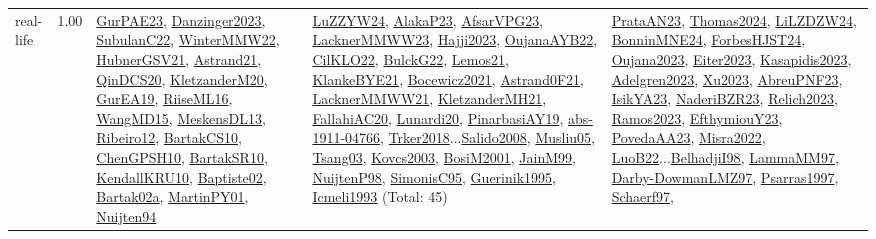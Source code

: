 {\begin{longtable}{p{3cm}r>{\raggedright\arraybackslash}p{6cm}>{\raggedright\arraybackslash}p{6cm}>{\raggedright\arraybackslash}p{8cm}}
\index{real-life}\index{Benchmarks!real-life}real-life &  1.00 & \hyperref[detail:GurPAE23]{GurPAE23}, \hyperref[detail:Danzinger2023]{Danzinger2023}, \hyperref[detail:SubulanC22]{SubulanC22}, \hyperref[detail:WinterMMW22]{WinterMMW22}, \hyperref[detail:HubnerGSV21]{HubnerGSV21}, \hyperref[detail:Astrand21]{Astrand21}, \hyperref[detail:QinDCS20]{QinDCS20}, \hyperref[detail:KletzanderM20]{KletzanderM20}, \hyperref[detail:GurEA19]{GurEA19}, \hyperref[detail:RiiseML16]{RiiseML16}, \hyperref[detail:WangMD15]{WangMD15}, \hyperref[detail:MeskensDL13]{MeskensDL13}, \hyperref[detail:Ribeiro12]{Ribeiro12}, \hyperref[detail:BartakCS10]{BartakCS10}, \hyperref[detail:ChenGPSH10]{ChenGPSH10}, \hyperref[detail:BartakSR10]{BartakSR10}, \hyperref[detail:KendallKRU10]{KendallKRU10}, \hyperref[detail:Baptiste02]{Baptiste02}, \hyperref[detail:Bartak02a]{Bartak02a}, \hyperref[detail:MartinPY01]{MartinPY01}, \hyperref[detail:Nuijten94]{Nuijten94} & \hyperref[detail:LuZZYW24]{LuZZYW24}, \hyperref[detail:AlakaP23]{AlakaP23}, \hyperref[detail:AfsarVPG23]{AfsarVPG23}, \hyperref[detail:LacknerMMWW23]{LacknerMMWW23}, \hyperref[detail:Hajji2023]{Hajji2023}, \hyperref[detail:OujanaAYB22]{OujanaAYB22}, \hyperref[detail:CilKLO22]{CilKLO22}, \hyperref[detail:BulckG22]{BulckG22}, \hyperref[detail:Lemos21]{Lemos21}, \hyperref[detail:KlankeBYE21]{KlankeBYE21}, \hyperref[detail:Bocewicz2021]{Bocewicz2021}, \hyperref[detail:Astrand0F21]{Astrand0F21}, \hyperref[detail:LacknerMMWW21]{LacknerMMWW21}, \hyperref[detail:KletzanderMH21]{KletzanderMH21}, \hyperref[detail:FallahiAC20]{FallahiAC20}, \hyperref[detail:Lunardi20]{Lunardi20}, \hyperref[detail:PinarbasiAY19]{PinarbasiAY19}, \hyperref[detail:abs-1911-04766]{abs-1911-04766}, \hyperref[detail:Trker2018]{Trker2018}...\hyperref[detail:Salido2008]{Salido2008}, \hyperref[detail:Musliu05]{Musliu05}, \hyperref[detail:Tsang03]{Tsang03}, \hyperref[detail:Kovcs2003]{Kovcs2003}, \hyperref[detail:BosiM2001]{BosiM2001}, \hyperref[detail:JainM99]{JainM99}, \hyperref[detail:NuijtenP98]{NuijtenP98}, \hyperref[detail:SimonisC95]{SimonisC95}, \hyperref[detail:Guerinik1995]{Guerinik1995}, \hyperref[detail:Icmeli1993]{Icmeli1993} (Total: 45) & \hyperref[detail:PrataAN23]{PrataAN23}, \hyperref[detail:Thomas2024]{Thomas2024}, \hyperref[detail:LiLZDZW24]{LiLZDZW24}, \hyperref[detail:BonninMNE24]{BonninMNE24}, \hyperref[detail:ForbesHJST24]{ForbesHJST24}, \hyperref[detail:Oujana2023]{Oujana2023}, \hyperref[detail:Eiter2023]{Eiter2023}, \hyperref[detail:Kasapidis2023]{Kasapidis2023}, \hyperref[detail:Adelgren2023]{Adelgren2023}, \hyperref[detail:Xu2023]{Xu2023}, \hyperref[detail:AbreuPNF23]{AbreuPNF23}, \hyperref[detail:IsikYA23]{IsikYA23}, \hyperref[detail:NaderiBZR23]{NaderiBZR23}, \hyperref[detail:Relich2023]{Relich2023}, \hyperref[detail:Ramos2023]{Ramos2023}, \hyperref[detail:EfthymiouY23]{EfthymiouY23}, \hyperref[detail:PovedaAA23]{PovedaAA23}, \hyperref[detail:Misra2022]{Misra2022}, \hyperref[detail:LuoB22]{LuoB22}...\hyperref[detail:BelhadjiI98]{BelhadjiI98}, \hyperref[detail:LammaMM97]{LammaMM97}, \hyperref[detail:Darby-DowmanLMZ97]{Darby-DowmanLMZ97}, \hyperref[detail:Psarras1997]{Psarras1997}, \hyperref[detail:Schaerf97]{Schaerf97}, 
\end{longtable}}
